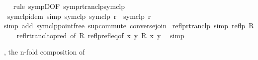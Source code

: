 \begin{isabellebody}
%
\isadelimproof
\ \ %
\endisadelimproof
%
\isatagproof
{}\isamarkupfalse%
{\isacharparenleft}{\kern0pt}rule\ sympD{\isacharbrackleft}{\kern0pt}OF\ symp{\isacharunderscore}{\kern0pt}rtranclp{\isacharunderscore}{\kern0pt}symclp{\isacharbrackright}{\kern0pt}{\isacharparenright}{\kern0pt}%
\endisatagproof
{\isafoldproof}%
%
\isadelimproof
\isanewline
%
\endisadelimproof
\isanewline
{}\isamarkupfalse%
\ symclp{\isacharunderscore}{\kern0pt}idem\ {\isacharbrackleft}{\kern0pt}simp{\isacharbrackright}{\kern0pt}{\isacharcolon}{\kern0pt}\ {\isachardoublequoteopen}symclp\ {\isacharparenleft}{\kern0pt}symclp\ r{\isacharparenright}{\kern0pt}\ {\isacharequal}{\kern0pt}\ symclp\ r{\isachardoublequoteclose}\isanewline
%
\isadelimproof
\ \ %
\endisadelimproof
%
\isatagproof
{}\isamarkupfalse%
{\isacharparenleft}{\kern0pt}simp\ add{\isacharcolon}{\kern0pt}\ symclp{\isacharunderscore}{\kern0pt}pointfree\ sup{\isacharunderscore}{\kern0pt}commute\ converse{\isacharunderscore}{\kern0pt}join{\isacharparenright}{\kern0pt}%
\endisatagproof
{\isafoldproof}%
%
\isadelimproof
\isanewline
%
\endisadelimproof
\isanewline
{}\isamarkupfalse%
\ reflp{\isacharunderscore}{\kern0pt}rtranclp\ {\isacharbrackleft}{\kern0pt}simp{\isacharbrackright}{\kern0pt}{\isacharcolon}{\kern0pt}\ {\isachardoublequoteopen}reflp\ R\isactrlsup {\isacharasterisk}{\kern0pt}\isactrlsup {\isacharasterisk}{\kern0pt}{\isachardoublequoteclose}\isanewline
%
\isadelimproof
\ \ %
\endisadelimproof
%
\isatagproof
{}\isamarkupfalse%
\ refl{\isacharunderscore}{\kern0pt}rtrancl{\isacharbrackleft}{\kern0pt}to{\isacharunderscore}{\kern0pt}pred{\isacharcomma}{\kern0pt}\ of\ R{\isacharbrackright}{\kern0pt}\ reflp{\isacharunderscore}{\kern0pt}refl{\isacharunderscore}{\kern0pt}eq{\isacharbrackleft}{\kern0pt}of\ {\isachardoublequoteopen}{\isacharbraceleft}{\kern0pt}{\isacharparenleft}{\kern0pt}x{\isacharcomma}{\kern0pt}\ y{\isacharparenright}{\kern0pt}{\isachardot}{\kern0pt}\ R\isactrlsup {\isacharasterisk}{\kern0pt}\isactrlsup {\isacharasterisk}{\kern0pt}\ x\ y{\isacharbraceright}{\kern0pt}{\isachardoublequoteclose}{\isacharbrackright}{\kern0pt}\ \isamarkupfalse%
\ simp%
\endisatagproof
{\isafoldproof}%
%
\isadelimproof
%
\endisadelimproof
%
\isadelimdocument
%
\endisadelimdocument
%
\isatagdocument
%
\isamarkuptrue%
%
\endisatagdocument
{\isafolddocument}%
%
\isadelimdocument
%
\endisadelimdocument
%
\begin{isamarkuptext}%
, the n-fold composition of %

\end{isamarkuptext}
\end{isabellebody}
